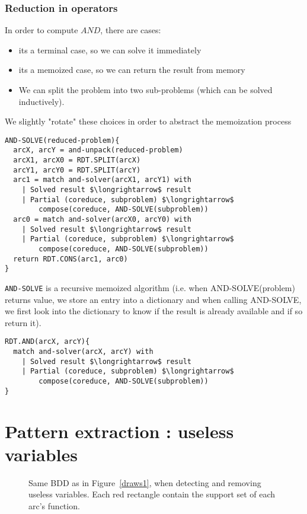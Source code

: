 \documentclass[a4paper,10pt]{article}
\newcommand{\includeframe}[4]{\makebox[#2\linewidth]{\texttt{[image: \#4]}}}
\begin{document}
\subsubsection{Reduction in operators}

In order to compute $AND$, there are cases:\begin{itemize}
  \item its a terminal case, so we can solve it immediately
  \item its a memoized case, so we can return the result from memory
  \item We can split the problem into two sub-problems (which can be solved inductively).
\end{itemize}
We slightly "rotate" these choices in order to abstract the memoization process

\begin{lstlisting}
AND-SOLVE(reduced-problem){
  arcX, arcY = and-unpack(reduced-problem)
  arcX1, arcX0 = RDT.SPLIT(arcX)
  arcY1, arcY0 = RDT.SPLIT(arcY)
  arc1 = match and-solver(arcX1, arcY1) with
    | Solved result $\longrightarrow$ result
    | Partial (coreduce, subproblem) $\longrightarrow$
    	compose(coreduce, AND-SOLVE(subproblem))
  arc0 = match and-solver(arcX0, arcY0) with
    | Solved result $\longrightarrow$ result
    | Partial (coreduce, subproblem) $\longrightarrow$
    	compose(coreduce, AND-SOLVE(subproblem))
  return RDT.CONS(arc1, arc0)
}
\end{lstlisting}
\texttt{AND-SOLVE} is a recursive memoized algorithm (i.e. when AND-SOLVE(problem) returns value, we store an entry into a dictionary and when calling AND-SOLVE, we first look into the dictionary to know if the result is already available and if so return it).
\begin{lstlisting}
RDT.AND(arcX, arcY){
  match and-solver(arcX, arcY) with
    | Solved result $\longrightarrow$ result
    | Partial (coreduce, subproblem) $\longrightarrow$
    	compose(coreduce, AND-SOLVE(subproblem))
}
\end{lstlisting}



\section{Pattern extraction : useless variables}
\begin{figure}
\centering
\includeframe{3}{1}{}{draws.pdf}
\caption{Same BDD as in Figure~\ref{draws1}, when detecting and removing useless variables. Each red rectangle contain the support set of each arc's function.}
\label{draws3}
\end{figure}
\end{document}
